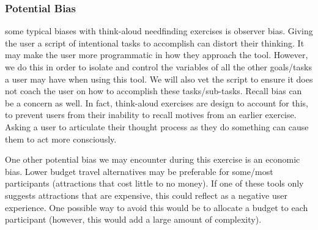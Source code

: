 \subsubsection{Potential Bias} some typical biases with think-aloud needfinding exercises is observer bias. Giving the user a script of intentional tasks to accomplish can distort their thinking. It may make the user more programmatic in how they approach the tool. However, we do this in order to isolate and control the variables of all the other goals/tasks a user may have when using this tool. We will also vet the script to ensure it does not coach the user on how to accomplish these tasks/sub-tasks. Recall bias can be a concern as well. In fact, think-aloud exercises are design to account for this, to prevent users from their inability to recall motives from an earlier exercise. Asking a user to articulate their thought process as they do something can cause them to act more consciously.

One other potential bias we may encounter during this exercise is an economic bias. Lower budget travel alternatives may be preferable for some/most participants (attractions that cost little to no money). If one of these tools only suggests attractions that are expensive, this could reflect as a negative user experience. One possible way to avoid this would be to allocate a budget to each participant (however, this would add a large amount of complexity).


